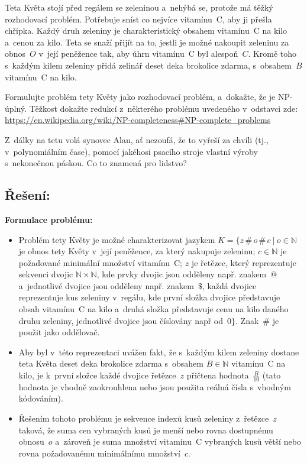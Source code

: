 \documentclass[a4paper, 11pt, fleqn]{scrartcl}
\begin{document}
	Teta Květa stojí před regálem se zeleninou a~nehýbá se, protože má těžký
	rozhodovací problém. Potřebuje sníst co nejvíce vitamínu~C, aby ji přešla
	chřipka. Každý druh zeleniny je charakteristický obsahem vitamínu~C na
	kilo a~cenou za kilo. Teta se snaží přijít na to, jestli je možné nakoupit
	zeleninu za obnos~$ O $ v~její peněžence tak, aby úhrn vitamínu~C byl
	alespoň~$ C $. Kromě toho s~každým kilem zeleniny přidá zelinář deset deka
	brokolice zdarma, s~obsahem~$ B $ vitamínu~C na kilo.
	\medskip

	Formulujte problém tety Květy jako rozhodovací problém, a~dokažte, že je
	NP-úplný. Těžkost dokažte redukcí z~některého problému uvedeného v~odstavci
	 zde: \\
	\url{https://en.wikipedia.org/wiki/NP-completeness\#NP-complete\_problems}
	\medskip

	Z~dálky na tetu volá synovec Alan, ať nezoufá, že to vyřeší za chvíli (tj.,
	v~polynomiálním čase), pomocí jakéhosi psacího stroje vlastní výroby
	s~nekonečnou páskou. Co to znamená pro lidstvo?

	\subsection*{Řešení:}

	\textbf{Formulace problému:}
	\begin{itemize}
		\item
			Problém tety Květy je možné charakterizovat jazykem $ K = \{
			z\,\#\,o\,\#\,c\ |\ o \in \mathbb{N} $ je obnos tety Květy v~její
			peněžence, za který nakupuje zeleninu; $ c \in \mathbb{N} $ je
			požadované minimální množství vitamínu~C; $ z $ je řetězec, který
			reprezentuje sekvenci dvojic $ \mathbb{N} \times \mathbb{N} $,
			kde prvky dvojic jsou odděleny např. znakem~$ @ $ a~jednotlivé
			dvojice jsou odděleny např. znakem~$ \$ $, každá dvojice
			reprezentuje kus zeleniny v~regálu, kde první složka dvojice
			představuje obsah vitamínu~C na kilo a~druhá složka představuje
			cenu na kilo daného druhu zeleniny, jednotlivé dvojice jsou
			číslovány např od~$ 0 \} $. Znak~$ \# $ je použit jako oddělovač.

		\item
			Aby byl v~této reprezentaci uvážen fakt, že s~každým kilem
			zeleniny dostane teta Květa deset deka brokolice zdarma
			s~obsahem $ B \in \mathbb{N} $ vitamínu~C na kilo, je k~první
			složce každé dvojice řetězce~$ z $ přičtena hodnota~$ \frac{B}{
			10} $ (tato hodnota je vhodně zaokrouhlena nebo jsou použita
			reálná čísla s~vhodným kódováním).

		\item
			Řešením tohoto problému je sekvence indexů kusů zeleniny
			z~řetězce~$ z $ taková, že suma cen vybraných kusů je menší nebo
			rovna dostupnému obnosu~$ o $ a~zároveň je suma množství
			vitamínu~C vybraných kusů větší nebo rovna požadovanému
			minimálnímu množství~$ c $.
	\end{itemize}
\end{document}

